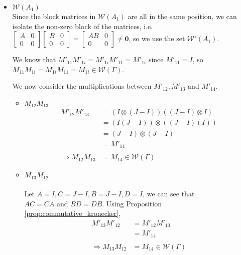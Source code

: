 \documentclass{article}
\begin{document}
\begin{itemize}
    \item $\mathcal{W}(A_1)$ \\
    Since the block matrices in $\mathcal{W}(A_1)$ are all in the same position, we can isolate the non-zero block of the matrices, i.e. $\begin{bmatrix}
        A & 0 \\ 0 & 0
    \end{bmatrix}\begin{bmatrix}
        B&0\\0&0
    \end{bmatrix} = \begin{bmatrix}
        AB&0\\0&0
    \end{bmatrix}\neq \mathbf{0}$, so we use the set $\mathcal{W'}(A_1)$.
    
    We know that $M'_{11}M'_{1i} = M'_{1i}M'_{11} = M'_{1i}$ since $M'_{11} = I$, so $M_{11}M_{1i} = M_{1i}M_{11} = M_{1i} \in \mathcal{W}(\Gamma)$.
    
    We now consider the multiplications between $M'_{12},M'_{13}\text{ and }M'_{14}$.
    \begin{itemize}
        \item $M_{12}M_{13}$ \\
        \begin{align*}
            M'_{12}M'_{13} &= (I \otimes (J-I))((J-I) \otimes I) \\
            &= (I(J-I))\otimes((J-I)(I)) \\
            &= (J-I)\otimes(J-I) \\
            &= M'_{14} \\\\
            \Rightarrow M_{12}M_{13} &= M_{14} \in \mathcal{W}(\Gamma)
        \end{align*}
        
        \item $M_{13}M_{12}$ \\ \\
        Let $A = I, C = J-I, B = J-I, D=I$, we can see that $AC=CA \text{ and } BD=DB$. Using Proposition \ref{prop:commutative_kronecker}, 
        \begin{align*}
            M'_{13}M'_{12} &= M'_{12}M'_{13} \\
            &= M'_{14} \\\\
            \Rightarrow M_{13}M_{12} &= M_{14}\in\mathcal{W}(\Gamma)
        \end{align*} \\
        

\end{itemize}
\end{itemize}
\end{document}
